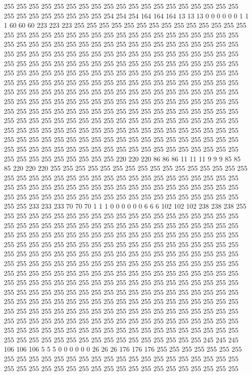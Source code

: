 255 255 255 255 255 255 255 255 255 255 255 255 255 255 255 255 255 255 255 255 255 255 255 255 255 255 255 254 254 254 164 164 164 13 13 13 0 0 0 0 0 0 1 1 1 60 60 60 223 223 223 255 255 255 255 255 255 255 255 255 255 255 255 255 255 255 255 255 255 255 255 255 255 255 255 255 255 255 255 255 255 255 255 255 255 255 255 255 255 255 255 255 255 255 255 255 255 255 255 255 255 255 255 255 255 255 255 255 255 255 255 255 255 255 255 255 255 255 255 255 255 255 255 255 255 255 255 255 
255 255 255 255 255 255 255 255 255 255 255 255 255 255 255 255 255 255 255 255 255 255 255 255 255 255 255 255 255 255 255 255 255 255 255 255 255 255 255 255 255 255 255 255 255 255 255 255 255 255 255 255 255 255 255 255 255 255 255 255 255 255 255 255 255 255 255 255 255 255 255 255 255 255 255 255 255 255 255 255 255 255 255 255 255 255 255 255 255 255 255 255 255 255 255 255 255 255 255 255 255 255 255 255 255 255 255 255 255 255 255 255 255 255 255 255 255 255 255 255 255 255 255 255 255 255 255 255 
255 255 255 255 255 255 255 255 255 255 255 255 255 255 255 255 255 255 255 255 255 255 255 255 255 255 255 255 255 255 255 255 255 255 255 255 255 255 255 255 255 255 255 255 255 255 255 255 255 255 255 255 255 255 255 255 255 255 255 255 255 255 255 255 255 220 220 220 86 86 86 11 11 11 9 9 9 85 85 85 220 220 220 255 255 255 255 255 255 255 255 255 255 255 255 255 255 255 255 255 255 255 255 255 255 255 255 255 255 255 255 255 255 255 255 255 255 255 255 255 255 255 255 255 255 255 255 255 
255 255 255 255 255 255 255 255 255 255 255 255 255 255 255 255 255 255 255 255 255 255 255 255 255 255 255 255 255 255 233 233 233 70 70 70 1 1 1 0 0 0 0 0 0 6 6 6 102 102 102 238 238 238 255 255 255 255 255 255 255 255 255 255 255 255 255 255 255 255 255 255 255 255 255 255 255 255 255 255 255 255 255 255 255 255 255 255 255 255 255 255 255 255 255 255 255 255 255 255 255 255 255 255 255 255 255 255 255 255 255 255 255 255 255 255 255 255 255 255 255 255 255 255 255 255 255 255 
255 255 255 255 255 255 255 255 255 255 255 255 255 255 255 255 255 255 255 255 255 255 255 255 255 255 255 255 255 255 255 255 255 255 255 255 255 255 255 255 255 255 255 255 255 255 255 255 255 255 255 255 255 255 255 255 255 255 255 255 255 255 255 255 255 255 255 255 255 255 255 255 255 255 255 255 255 255 255 255 255 255 255 255 255 255 255 255 255 255 255 255 255 255 255 255 255 255 255 255 255 255 255 255 255 255 255 255 255 255 255 255 255 255 255 255 255 255 255 255 255 255 255 255 255 255 255 255 
255 255 255 255 255 255 255 255 255 255 255 255 255 255 255 255 255 255 255 255 255 255 255 255 255 255 255 255 255 255 255 255 255 255 255 255 255 255 255 255 255 255 255 255 255 255 255 255 255 255 255 255 255 255 255 255 255 255 255 255 255 255 245 245 245 106 106 106 5 5 5 0 0 0 0 0 0 26 26 26 176 176 176 255 255 255 255 255 255 255 255 255 255 255 255 255 255 255 255 255 255 255 255 255 255 255 255 255 255 255 255 255 255 255 255 255 255 255 255 255 255 255 255 255 255 255 255 255 
